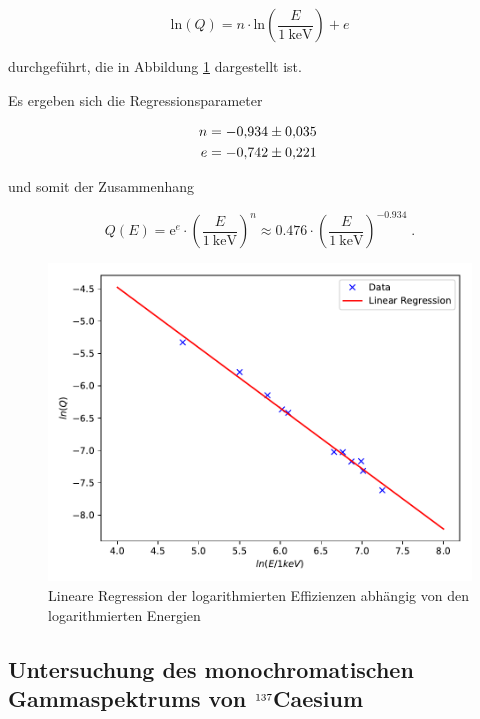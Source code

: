 \begin{equation}
  \text{ln}(Q) = n \cdot \text{ln}(\frac{E}{\SI{1}{\kilo\eV}}) + e
\end{equation}

durchgeführt, die in Abbildung \ref{fig:plot6} dargestellt ist.

Es ergeben sich die Regressionsparameter

\begin{align*}
  n &= \num{-0.934 +- 0.035} \\
  e &= \num{-0.742 +- 0.221} \; 
\end{align*}

und somit der Zusammenhang

\begin{equation}
  \label{eqn:eff}
  Q(E) = \text{e}^e \cdot \left(\frac{E}{\SI{1}{\kilo\eV}}\right)^n 
  \approx \num{0.476} \cdot \left(\frac{E}{\SI{1}{\kilo\eV}}\right)^{\num{-0.934}} \; .
\end{equation}

\begin{figure}[H]
  \centering
  \includegraphics[scale=0.7]{content/plot6.pdf}
  \caption{Lineare Regression der logarithmierten Effizienzen abhängig von den logarithmierten Energien}
  \label{fig:plot6}
\end{figure}


\subsection{Untersuchung des monochromatischen Gammaspektrums von $\ce{^{137}}$Caesium}

